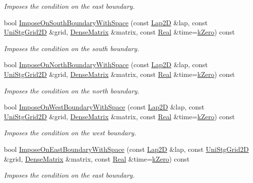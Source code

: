 \begin{DoxyCompactItemize}
\begin{DoxyCompactList}\small\item\em Imposes the condition on the east boundary. \end{DoxyCompactList}\item 
bool \hyperlink{classmtk_1_1RobinBCDescriptor2D_a2f99cdd8bda2bc46cf259bb96ef4bd49}{Impose\+On\+South\+Boundary\+With\+Space} (const \hyperlink{classmtk_1_1Lap2D}{Lap2\+D} \&lap, const \hyperlink{classmtk_1_1UniStgGrid2D}{Uni\+Stg\+Grid2\+D} \&grid, \hyperlink{classmtk_1_1DenseMatrix}{Dense\+Matrix} \&matrix, const \hyperlink{group__c01-roots_gac080bbbf5cbb5502c9f00405f894857d}{Real} \&time=\hyperlink{group__c01-roots_ga59a451a5fae30d59649bcda274fea271}{k\+Zero}) const 
\begin{DoxyCompactList}\small\item\em Imposes the condition on the south boundary. \end{DoxyCompactList}\item 
bool \hyperlink{classmtk_1_1RobinBCDescriptor2D_afdf9cc19481303564a17c8c7157d57cb}{Impose\+On\+North\+Boundary\+With\+Space} (const \hyperlink{classmtk_1_1Lap2D}{Lap2\+D} \&lap, const \hyperlink{classmtk_1_1UniStgGrid2D}{Uni\+Stg\+Grid2\+D} \&grid, \hyperlink{classmtk_1_1DenseMatrix}{Dense\+Matrix} \&matrix, const \hyperlink{group__c01-roots_gac080bbbf5cbb5502c9f00405f894857d}{Real} \&time=\hyperlink{group__c01-roots_ga59a451a5fae30d59649bcda274fea271}{k\+Zero}) const 
\begin{DoxyCompactList}\small\item\em Imposes the condition on the north boundary. \end{DoxyCompactList}\item 
bool \hyperlink{classmtk_1_1RobinBCDescriptor2D_adbfdfa9c6b93df8d23c50686b5b356ef}{Impose\+On\+West\+Boundary\+With\+Space} (const \hyperlink{classmtk_1_1Lap2D}{Lap2\+D} \&lap, const \hyperlink{classmtk_1_1UniStgGrid2D}{Uni\+Stg\+Grid2\+D} \&grid, \hyperlink{classmtk_1_1DenseMatrix}{Dense\+Matrix} \&matrix, const \hyperlink{group__c01-roots_gac080bbbf5cbb5502c9f00405f894857d}{Real} \&time=\hyperlink{group__c01-roots_ga59a451a5fae30d59649bcda274fea271}{k\+Zero}) const 
\begin{DoxyCompactList}\small\item\em Imposes the condition on the west boundary. \end{DoxyCompactList}\item 
bool \hyperlink{classmtk_1_1RobinBCDescriptor2D_a37efc8077bf5ea4f28539da248dc2a41}{Impose\+On\+East\+Boundary\+With\+Space} (const \hyperlink{classmtk_1_1Lap2D}{Lap2\+D} \&lap, const \hyperlink{classmtk_1_1UniStgGrid2D}{Uni\+Stg\+Grid2\+D} \&grid, \hyperlink{classmtk_1_1DenseMatrix}{Dense\+Matrix} \&matrix, const \hyperlink{group__c01-roots_gac080bbbf5cbb5502c9f00405f894857d}{Real} \&time=\hyperlink{group__c01-roots_ga59a451a5fae30d59649bcda274fea271}{k\+Zero}) const 
\begin{DoxyCompactList}\small\item\em Imposes the condition on the east boundary. \end{DoxyCompactList}\end{DoxyCompactItemize}

